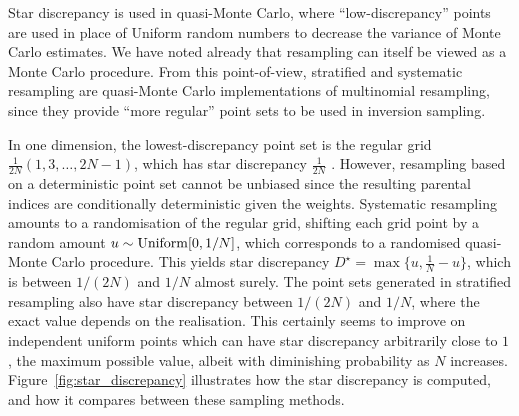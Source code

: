Star discrepancy is used in quasi-Monte Carlo, where ``low-discrepancy'' points are used in place of Uniform random numbers to decrease the variance of Monte Carlo estimates.
We have noted already that resampling can itself be viewed as a Monte Carlo procedure.
From this point-of-view, stratified and systematic resampling are quasi-Monte Carlo implementations of multinomial resampling, since they provide ``more regular'' point sets to be used in inversion sampling.

In one dimension, the lowest-discrepancy point set is the regular grid $\frac{1}{2N}(1, 3, \dots, 2N-1)$, which has star discrepancy $\frac{1}{2N}$ \parencite[see for example][Corollary 1.2]{kuipers1974}.
However, resampling based on a deterministic point set cannot be unbiased since the resulting parental indices are conditionally deterministic given the weights.
Systematic resampling amounts to a randomisation of the regular grid, shifting each grid point by a random amount $u \sim \operatorname{Uniform}[0,1/N]$, which corresponds to a randomised quasi-Monte Carlo procedure. This yields star discrepancy $D^\star = \max\{u, \frac{1}{N} -u\}$, which is between $1/(2N)$ and $1/N$ almost surely.
The point sets generated in stratified resampling also have star discrepancy between $1/(2N)$ and $1/N$, where the exact value depends on the realisation.
This certainly seems to improve on independent uniform points which can have star discrepancy arbitrarily close to $1$, the maximum possible value, albeit with diminishing probability as $N$ increases.
Figure~\ref{fig:star_discrepancy} illustrates how the star discrepancy is computed, and how it compares between these sampling methods.





